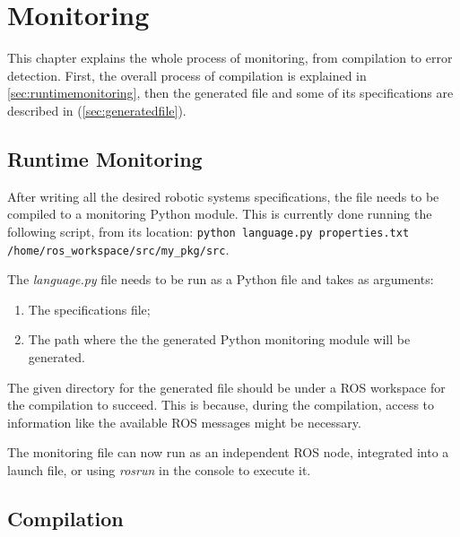 \chapter{Monitoring}
\label{chap:monitoring}

This chapter explains the whole process of monitoring, from compilation to error detection. First, the overall process of compilation is explained in \autoref{sec:runtimemonitoring}, then the generated file and some of its specifications are described in (\autoref{sec:generatedfile}).


\section{Runtime Monitoring}
\label{sec:runtimemonitoring}

After writing all the desired robotic systems specifications, the file needs to be compiled to a monitoring Python module. This is currently done running the following script, from its location: \lstinline{python language.py properties.txt /home/ros_workspace/src/my_pkg/src}.

The \textit{language.py} file needs to be run as a Python file and takes as arguments:

\begin{enumerate}
    \item The specifications file;
    \item The path where the the generated Python monitoring module will be generated.
\end{enumerate}

The given directory for the generated file should be under a ROS workspace for the compilation to succeed. This is because, during the compilation, access to information like the available ROS messages might be necessary.

The monitoring file can now run as an independent ROS node, integrated into a launch file, or using \textit{rosrun} in the console to execute it.


\section{Compilation} 
\label{sec:generatedfile}

